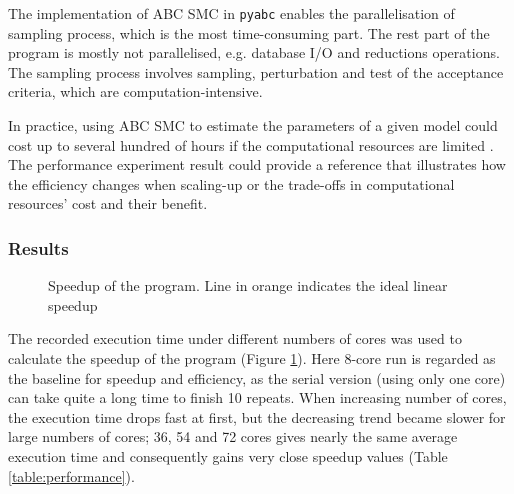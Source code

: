 The implementation of ABC SMC in \verb|pyabc| enables the parallelisation of sampling process, which is the most time-consuming part. The rest part of the program is mostly not parallelised, e.g. database I/O and reductions operations. The sampling process involves sampling, perturbation and test of the acceptance criteria, which are computation-intensive.

In practice, using ABC SMC to estimate the parameters of a given model could cost up to several hundred of hours if the computational resources are limited \cite{ref:compare}. The performance experiment result could provide a reference that illustrates how the efficiency changes when scaling-up or the trade-offs in computational resources' cost and their benefit.

\subsubsection{Results}




\begin{figure}[h]
    \begin{center}
    \end{center}

    \caption[Speedup of the program]{Speedup of the program. Line in orange indicates the ideal linear speedup}
    \label{fig:speedup}
\end{figure}

The recorded execution time under different numbers of cores was used to calculate the speedup of the program (Figure \ref{fig:speedup}). Here 8-core run is regarded as the baseline for speedup and efficiency, as the serial version (using only one core) can take quite a long time to finish 10 repeats. When increasing number of cores, the execution time drops fast at first, but the decreasing trend became slower for large numbers of cores; 36, 54 and 72 cores gives nearly the same average execution time and consequently gains very close speedup values (Table \ref{table:performance}).

